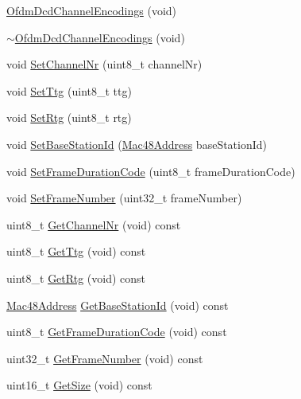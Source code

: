\begin{DoxyCompactItemize}
\item 
\hyperlink{classns3_1_1OfdmDcdChannelEncodings_a126b44144ccdefc3ba6dcec507734a47}{Ofdm\+Dcd\+Channel\+Encodings} (void)
\item 
\hyperlink{classns3_1_1OfdmDcdChannelEncodings_a0bcb8af0db0ac4cf3452ff30314bd3e4}{$\sim$\+Ofdm\+Dcd\+Channel\+Encodings} (void)
\item 
void \hyperlink{classns3_1_1OfdmDcdChannelEncodings_a526255a09fa137ca7d2dc0835953873a}{Set\+Channel\+Nr} (uint8\+\_\+t channel\+Nr)
\item 
void \hyperlink{classns3_1_1OfdmDcdChannelEncodings_a60e566a9f427b43f7bde549f3a6d827f}{Set\+Ttg} (uint8\+\_\+t ttg)
\item 
void \hyperlink{classns3_1_1OfdmDcdChannelEncodings_aa16e6ff9f933c7a245cb7dbe4bb7ed52}{Set\+Rtg} (uint8\+\_\+t rtg)
\item 
void \hyperlink{classns3_1_1OfdmDcdChannelEncodings_afc231a10398aba2f21dccf5b55765865}{Set\+Base\+Station\+Id} (\hyperlink{classns3_1_1Mac48Address}{Mac48\+Address} base\+Station\+Id)
\item 
void \hyperlink{classns3_1_1OfdmDcdChannelEncodings_a6de921dc3258a81cd58f0b1759c68901}{Set\+Frame\+Duration\+Code} (uint8\+\_\+t frame\+Duration\+Code)
\item 
void \hyperlink{classns3_1_1OfdmDcdChannelEncodings_aab1f965e351d4226c2b273341e0c0c57}{Set\+Frame\+Number} (uint32\+\_\+t frame\+Number)
\item 
uint8\+\_\+t \hyperlink{classns3_1_1OfdmDcdChannelEncodings_aef867d6a3ffd9a49f2854050c4258c81}{Get\+Channel\+Nr} (void) const 
\item 
uint8\+\_\+t \hyperlink{classns3_1_1OfdmDcdChannelEncodings_a43fd4a4d0be2c79d990407ba640a1c53}{Get\+Ttg} (void) const 
\item 
uint8\+\_\+t \hyperlink{classns3_1_1OfdmDcdChannelEncodings_af587022e21417f52437cd2b205f7b62c}{Get\+Rtg} (void) const 
\item 
\hyperlink{classns3_1_1Mac48Address}{Mac48\+Address} \hyperlink{classns3_1_1OfdmDcdChannelEncodings_a1176b0d5bdefba5212218dedea2e478f}{Get\+Base\+Station\+Id} (void) const 
\item 
uint8\+\_\+t \hyperlink{classns3_1_1OfdmDcdChannelEncodings_a27f800fa403bbd148c4e6672f08ec281}{Get\+Frame\+Duration\+Code} (void) const 
\item 
uint32\+\_\+t \hyperlink{classns3_1_1OfdmDcdChannelEncodings_a98d1b04ec1a57298d54d4aa2142fea77}{Get\+Frame\+Number} (void) const 
\item 
uint16\+\_\+t \hyperlink{classns3_1_1OfdmDcdChannelEncodings_aa114d471303c1413cda5d2537eaeaaab}{Get\+Size} (void) const 
\end{DoxyCompactItemize}
